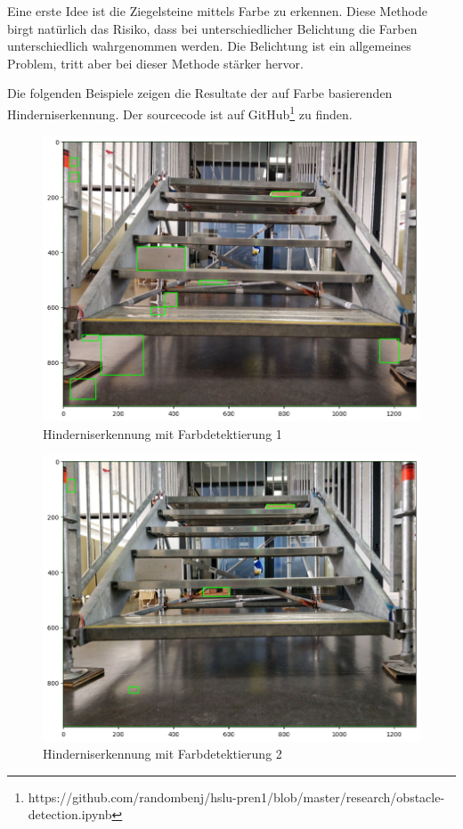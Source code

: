 Eine erste Idee ist die Ziegelsteine mittels Farbe zu erkennen. Diese Methode birgt natürlich das Risiko, dass bei unterschiedlicher Belichtung die Farben unterschiedlich wahrgenommen werden. Die Belichtung ist ein allgemeines Problem, tritt aber bei dieser Methode stärker hervor.

Die folgenden Beispiele zeigen die Resultate der auf Farbe basierenden 
Hinderniserkennung. Der sourcecode ist auf GitHub\footnote{https://github.com/randombenj/hslu-pren1/blob/master/research/obstacle-detection.ipynb} zu finden.

\begin{figure}[H]
  \includegraphics[width=1.0\textwidth]{img/hinderniserkennung/color-detection1.png}
  \centering
  \caption{Hinderniserkennung mit Farbdetektierung 1}
  \label{fig:color-detection-1}
\end{figure}

\begin{figure}[H]
  \includegraphics[width=1.0\textwidth]{img/hinderniserkennung/color-detection2.png}
  \centering
  \caption{Hinderniserkennung mit Farbdetektierung 2}
  \label{fig:color-detection-2}
\end{figure}

